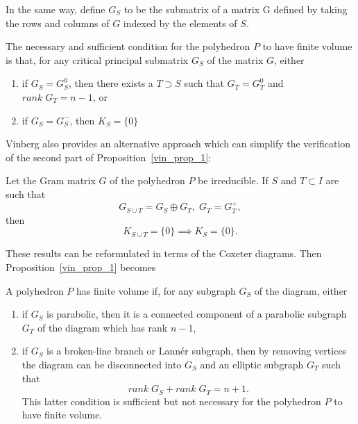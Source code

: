 \documentclass[smallcondensed]{svjour3}                     %
\begin{document}
In the same way, define $G_S$ to be the submatrix of a matrix G defined by taking the rows and columns of $G$ indexed by the elements of $S$.

\begin{proposition}\label{vin_prop_1}
  The necessary and sufficient condition for the polyhedron $P$ to have finite volume is that, for any critical principal submatrix $G_S$ of the matrix $G$, either
\begin{enumerate}
\item if $G_S = G_S^0$, then there exists a $T \supset S$ such that $G_T = G_T^0$ and $rank \; G_T = n-1$, or
\item if $G_S=G_S^-$, then $K_S = \{0\}$
\end{enumerate}
\end{proposition}

Vinberg also provides an alternative approach which can simplify the verification of the second part of Proposition~\ref{vin_prop_1}:
\begin{proposition}\label{vin_prop_2}
Let the Gram matrix $G$ of the polyhedron $P$ be irreducible. If $S$ and $T \subset I$ are such that
\[G_{S\cup T} = G_S \oplus G_T, \; G_T = G_T^+,\]
then
\[K_{S\cup T} = \{0\}\implies K_S = \{0\}.\]
\end{proposition}

These results can be reformulated in terms of the Coxeter diagrams. Then Proposition~\ref{vin_prop_1} becomes
\begin{corollary}\label{vin_unwritten_prop}
A polyhedron $P$ has finite volume if, for any subgraph $G_S$ of the diagram, either
\begin{enumerate}
\item if $G_S$ is parabolic, then it is a connected component of a parabolic subgraph $G_T$ of the diagram which has rank $n-1$,
\item if $G_S$ is a broken-line branch or Lann\'{e}r subgraph, then by removing vertices the diagram can be disconnected into $G_S$ and an elliptic subgraph $G_T$ such that \[rank \; G_S + rank \; G_T = n+1.\] This latter condition is sufficient but not necessary for the polyhedron $P$ to have finite volume.
\end{enumerate}
\end{corollary}
\end{document}

